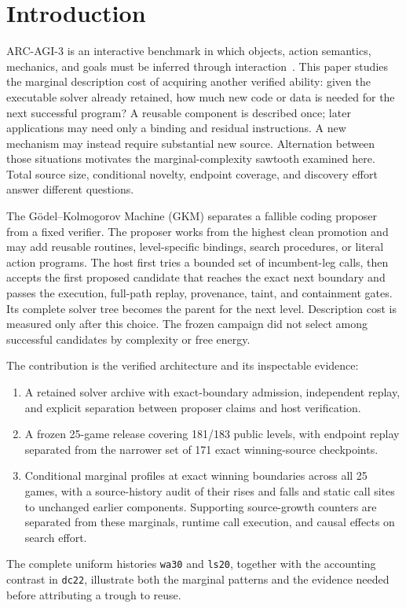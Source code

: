 \documentclass[11pt]{article}
\theoremstyle{definition}
\theoremstyle{remark}
\begin{document}
\section{Introduction}
ARC-AGI-3 is an interactive benchmark in which objects, action semantics, mechanics,
and goals must be inferred through interaction~\cite{chollet2019measure,arcagi3}.
This paper studies the marginal description cost of acquiring another verified
ability: given the executable solver already retained, how much new code or data
is needed for the next successful program? A reusable component is described once;
later applications may need only a binding and residual instructions. A new mechanism
may instead require substantial new source. Alternation between those situations
motivates the marginal-complexity sawtooth examined here. Total source size,
conditional novelty, endpoint coverage, and discovery effort answer different questions.

The G\"odel--Kolmogorov Machine (GKM) separates a fallible coding proposer from a
fixed verifier. The proposer works from the highest clean promotion and may add
reusable routines, level-specific bindings, search procedures, or literal action
programs. The host first tries a bounded set of incumbent-leg calls, then accepts
the first proposed candidate that reaches the exact next boundary and passes the
execution, full-path replay, provenance, taint, and containment gates. Its complete
solver tree becomes the parent for the next level. Description cost is measured
only after this choice. The frozen campaign did not select among successful
candidates by complexity or free energy.

The contribution is the verified architecture and its inspectable evidence:
\begin{enumerate}[leftmargin=2.1em]
\item A retained solver archive with exact-boundary admission, independent replay,
and explicit separation between proposer claims and host verification.
\item A frozen 25-game release covering 181/183 public levels, with endpoint replay
separated from the narrower set of 171 exact winning-source checkpoints.
\item Conditional marginal profiles at exact winning boundaries across all 25 games,
with a source-history audit of their rises and falls and static call sites to unchanged
earlier components. Supporting source-growth counters are separated from these
marginals, runtime call execution, and causal effects on search effort.
\end{enumerate}
The complete uniform histories \texttt{wa30} and \texttt{ls20}, together with the
accounting contrast in \texttt{dc22}, illustrate both the marginal patterns and
the evidence needed before attributing a trough to reuse.
\end{document}
